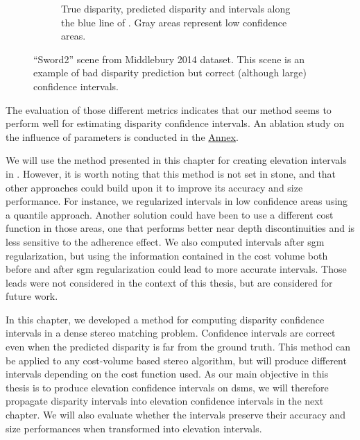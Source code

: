 \begin{figure}
\begin{subfigure}[t]{1\linewidth}
        \caption{True disparity, predicted disparity and intervals along the blue line of . Gray areas represent low confidence areas.}
        \label{fig:sword2_c}
    \end{subfigure}
    \caption{``Sword2'' scene from Middlebury 2014 dataset. This scene is an example of bad disparity prediction but correct (although large) confidence intervals.}
    \label{fig:sword2}
\end{figure}

The evaluation of those different metrics indicates that our method seems to perform well for estimating disparity confidence intervals. An ablation study on the influence of parameters is conducted in the \hyperref[chap:annex]{Annex}. 

We will use the method presented in this chapter for creating elevation intervals in . However, it is worth noting that this method is not set in stone, and that other approaches could build upon it to improve its accuracy and size performance. For instance, we regularized intervals in low confidence areas using a quantile approach. Another solution could have been to use a different cost function in those areas, one that performs better near depth discontinuities and is less sensitive to the adherence effect. We also computed intervals after \acrshort{sgm} regularization, but using the information contained in the cost volume both before and after \acrshort{sgm} regularization could lead to more accurate intervals. Those leads were not considered in the context of this thesis, but are considered for future work.

\begin{conclusion}
    In this chapter, we developed a method for computing disparity confidence intervals in a dense stereo matching problem. Confidence intervals are correct even when the predicted disparity is far from the ground truth. This method can be applied to any cost-volume based stereo algorithm, but will produce different intervals depending on the cost function used. As our main objective in this thesis is to produce elevation confidence intervals on \acrshort{dsm}s, we will therefore propagate disparity intervals into elevation confidence intervals in the next chapter. We will also evaluate whether the intervals preserve their accuracy and size performances when transformed into elevation intervals.
\end{conclusion}

\clearpage